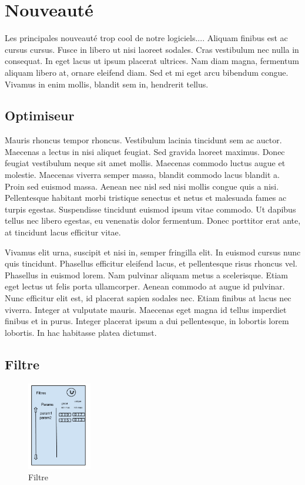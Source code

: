 \section{Nouveauté}
	
	Les principales nouveauté trop cool de notre logiciels....	Aliquam finibus est ac cursus cursus. Fusce in libero ut nisi laoreet sodales. Cras vestibulum nec nulla in consequat. In eget lacus ut ipsum placerat ultrices. Nam diam magna, fermentum aliquam libero at, ornare eleifend diam. Sed et mi eget arcu bibendum congue. Vivamus in enim mollis, blandit sem in, hendrerit tellus.


	\subsection{Optimiseur}

		Mauris rhoncus tempor rhoncus. Vestibulum lacinia tincidunt sem ac auctor. Maecenas a lectus in nisi aliquet feugiat. Sed gravida laoreet maximus. Donec feugiat vestibulum neque sit amet mollis. Maecenas commodo luctus augue et molestie. Maecenas viverra semper massa, blandit commodo lacus blandit a. Proin sed euismod massa. Aenean nec nisl sed nisi mollis congue quis a nisi. Pellentesque habitant morbi tristique senectus et netus et malesuada fames ac turpis egestas. Suspendisse tincidunt euismod ipsum vitae commodo. Ut dapibus tellus nec libero egestas, eu venenatis dolor fermentum. Donec porttitor erat ante, at tincidunt lacus efficitur vitae.

		Vivamus elit urna, suscipit et nisi in, semper fringilla elit. In euismod cursus nunc quis tincidunt. Phasellus efficitur eleifend lacus, et pellentesque risus rhoncus vel. Phasellus in euismod lorem. Nam pulvinar aliquam metus a scelerisque. Etiam eget lectus ut felis porta ullamcorper. Aenean commodo at augue id pulvinar. Nunc efficitur elit est, id placerat sapien sodales nec. Etiam finibus at lacus nec viverra. Integer at vulputate mauris. Maecenas eget magna id tellus imperdiet finibus et in purus. Integer placerat ipsum a dui pellentesque, in lobortis lorem lobortis. In hac habitasse platea dictumst. 

	\subsection{Filtre}
		\begin{figure}
			\begin{center}
				\includegraphics[width=0.25\textwidth]{figure/filtre.png}
			\end{center}
			\caption{Filtre}
			\label{fig:filtre}
		\end{figure}


